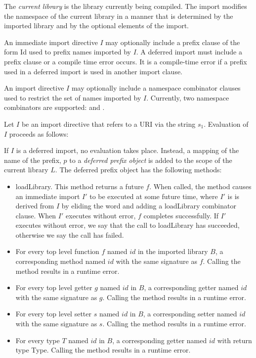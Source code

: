 \documentclass{article}
\newcommand{\code}[1]{{\sf #1}}
\begin{document}
\begin{itemize}
\LMHash{}
The {\em current library} is the library currently being compiled. The import modifies the  namespace of the current library in a manner that is determined by the imported library and by the optional elements of  the import.

\LMHash{}
An immediate import directive $I$ may optionally include a prefix clause of the form \AS{} \code{Id} used to prefix names imported by $I$. A deferred import must include a prefix clause or a compile time error occurs. It is a compile-time error if a prefix used in a deferred import is used in another import clause.

\LMHash{}
An import directive $I$ may optionally include a namespace combinator clauses used to restrict the set of names imported by $I$. Currently, two namespace combinators are supported: \HIDE{} and \SHOW{}.

\LMHash{}
Let $I$ be an import directive that refers to a URI via the string $s_1$. Evaluation of $I$  proceeds as follows:

\LMHash{}
If $I$ is a deferred import, no evaluation takes place. Instead, a mapping of the name of the prefix, $p$ to a {\em deferred prefix object} is added to the scope of the current library $L$.
The deferred prefix object has the following methods:

\begin{itemize}
\item \code{loadLibrary}. This method returns a future $f$. When called, the method causes an immediate import $I'$ to be executed at some future time, where $I'$ is is derived from $I$ by eliding the word \DEFERRED{} and adding a \HIDE{} \code{loadLibrary}  combinator clause. When $I'$ executes without error, $f$ completes successfully. If $I'$ executes without error, we say that the call to \code{loadLibrary} has succeeded, otherwise we say the call has failed.
\item  For every top level function $f$ named $id$ in the imported library $B$, a corresponding method named $id$ with the same signature as $f$. Calling the method results in a runtime error.
\item For every top level getter $g$ named $id$ in $B$, a corresponding getter named $id$ with the same signature as $g$.  Calling the method results in a runtime error.
\item For every top level setter $s$ named $id$ in $B$, a corresponding setter named $id$ with the same signature as $s$.  Calling the method results in a runtime error.
\item For every type $T$ named $id$ in $B$, a corresponding getter named $id$ with return type \code{Type}.  Calling the method results in a runtime error.
\end{itemize}


\end{itemize}
\end{document}
